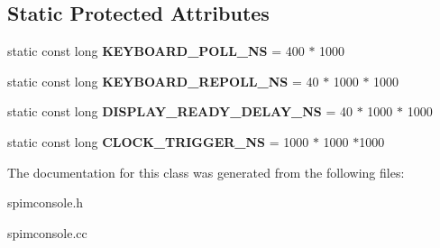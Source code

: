 \subsection*{Static Protected Attributes}
\begin{DoxyCompactItemize}
\item 
\hypertarget{classSpimConsoleDevice_a4f5c6639fafcb0e60141c55d42e74c80}{
static const long {\bfseries KEYBOARD\_\-POLL\_\-NS} = 400 $\ast$ 1000}
\label{classSpimConsoleDevice_a4f5c6639fafcb0e60141c55d42e74c80}

\item 
\hypertarget{classSpimConsoleDevice_a42c7c6cd43f403cbfaf11e4e688145e3}{
static const long {\bfseries KEYBOARD\_\-REPOLL\_\-NS} = 40 $\ast$ 1000 $\ast$ 1000}
\label{classSpimConsoleDevice_a42c7c6cd43f403cbfaf11e4e688145e3}

\item 
\hypertarget{classSpimConsoleDevice_a63a0316380e0fec7d91e01fb41e962af}{
static const long {\bfseries DISPLAY\_\-READY\_\-DELAY\_\-NS} = 40 $\ast$ 1000 $\ast$ 1000}
\label{classSpimConsoleDevice_a63a0316380e0fec7d91e01fb41e962af}

\item 
\hypertarget{classSpimConsoleDevice_a6ee877243858bff6624f76b87db50320}{
static const long {\bfseries CLOCK\_\-TRIGGER\_\-NS} = 1000 $\ast$ 1000 $\ast$1000}
\label{classSpimConsoleDevice_a6ee877243858bff6624f76b87db50320}

\end{DoxyCompactItemize}


The documentation for this class was generated from the following files:\begin{DoxyCompactItemize}
\item 
spimconsole.h\item 
spimconsole.cc\end{DoxyCompactItemize}
